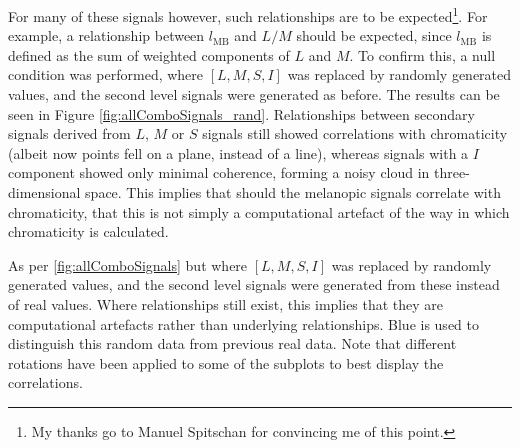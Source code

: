 For many of these signals however, such relationships are to be expected\footnote{My thanks go to Manuel Spitschan for convincing me of this point.}. For example, a relationship between $l_{\text{MB}}$ and $L/M$ should be expected, since $l_{\text{MB}}$ is defined as the sum of weighted components of $L$ and $M$. To confirm this, a null condition was performed, where $[L,M,S,I]$ was replaced by randomly generated values, and the second level signals were generated as before. The results can be seen in Figure \ref{fig:allComboSignals_rand}. Relationships between secondary signals derived from $L$, $M$ or $S$ signals still showed correlations with chromaticity (albeit now points fell on a plane, instead of a line), whereas signals with a $I$ component showed only minimal coherence, forming a noisy cloud in three-dimensional space. This implies that should the melanopic signals correlate with chromaticity, that this is not simply a computational artefact of the way in which chromaticity is calculated.

% 



\begin{fullpagefigure}
\caption{As per \ref{fig:allComboSignals} but where $[L,M,S,I]$ was replaced by randomly generated values, and the second level signals were generated from these instead of real values. Where relationships still exist, this implies that they are computational artefacts rather than underlying relationships. Blue is used to distinguish this random data from previous real data. Note that different rotations have been applied to some of the subplots to best display the correlations.}
\label{fig:allComboSignals_rand}
\end{fullpagefigure}


